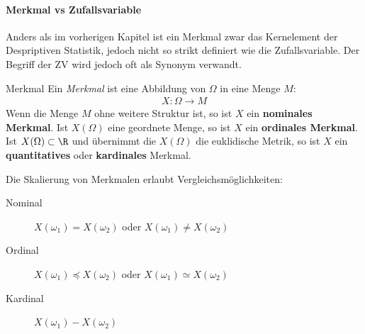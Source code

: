 \paragraph{Merkmal vs Zufallsvariable}
Anders als im vorherigen Kapitel ist ein Merkmal zwar das Kernelement der Despriptiven Statistik, jedoch nicht so strikt definiert wie die Zufallsvariable. Der Begriff der \gls{ZV} wird jedoch oft als Synonym verwandt.
\begin{Definition}{Merkmal}
	Ein \textit{Merkmal} ist eine Abbildung von $\Omega$ in eine Menge $M$:
	\begin{align*}
		X : \Omega \rightarrow M
	\end{align*}
	Wenn die Menge $M$ ohne weitere Struktur ist, so ist $X$ ein \textbf{nominales Merkmal}. Ist $X(\Omega)$ eine geordnete Menge, so ist $X$ ein \textbf{ordinales Merkmal}. Ist $X(\Omega)\subset \R$ und übernimmt die $X(\Omega)$ die euklidische Metrik, so ist $X$ ein \textbf{quantitatives} oder \textbf{kardinales} Merkmal.
\end{Definition}
Die Skalierung von Merkmalen erlaubt Vergleichsmöglichkeiten:
\begin{description}
	\item[Nominal] $X(\omega_1) = X(\omega_2)$ oder $X(\omega_1) \neq X(\omega_2)$
	\item[Ordinal] $X(\omega_1) \preceq X(\omega_2)$ oder $X(\omega_1) \simeq X(\omega_2)$
	\item[Kardinal] $X(\omega_1) - X(\omega_2)$
\end{description}